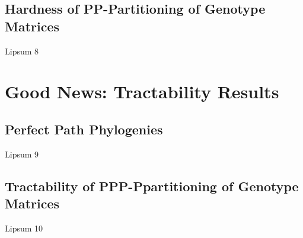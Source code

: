 \documentclass[]{beamer}
\begin{document}
	\subsection{Hardness of PP-Partitioning of 										Genotype Matrices}
	\begin{frame}{Lipsum 8}
	\lipsum[8]
	\end{frame}
\section{Good News: Tractability Results}
	\subsection{Perfect Path Phylogenies}
	\begin{frame}{Lipsum 9}
	\lipsum[9]
	\end{frame}
	\subsection{Tractability of PPP-Ppartitioning of 			Genotype Matrices}
	\begin{frame}{Lipsum 10}
	\begin{center}
	\lipsum[10]
	\end{center}
	\end{frame}
\end{document}
